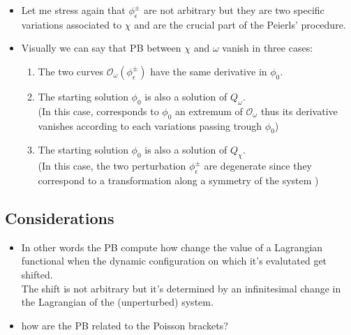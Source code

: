 \documentclass[a4paper,11pt]{scrartcl}
\begin{document}
\begin{itemize}
        \item Let me stress again that $ \phi_\epsilon^\pm$ are not arbitrary but they are two specific variations associated to $\chi$ and are the crucial part of the Peierls' procedure.
        \item Visually we can say that PB between $\chi$ and $\omega$ vanish in three cases:
        \begin{enumerate}
            \item The two curves $\mathcal{O}_\omega ( \phi_\epsilon^\pm)$ have the same derivative in $\phi_0$.
            \item The starting solution $\phi_0$ is also a solution of $Q_\omega$.\\
                (In this case, corresponds to $\phi_0$  an extremum of $\mathcal{O}_\omega$ thus its derivative vanishes according to each variations passing trough $\phi_0$)
            \item The starting solution $\phi_0$ is also a solution of $Q_\chi$.\\
                (In this case, the two perturbation $\phi_\epsilon^\pm$ are degenerate since they correspond to a transformation along a symmetry of the system )
        \end{enumerate}

    \end{itemize}
    \subsection{Considerations}
    \begin{itemize}
    \item In other words the PB compute how change the value of a Lagrangian functional when the dynamic configuration on which it's evalutated get shifted.\\
    The shift is  not arbitrary but it's determined by an infinitesimal change in the Lagrangian of the (unperturbed) system.
    \item how are the PB related to the Poisson brackets?
    \end{itemize}
    \newpage
\end{document}
